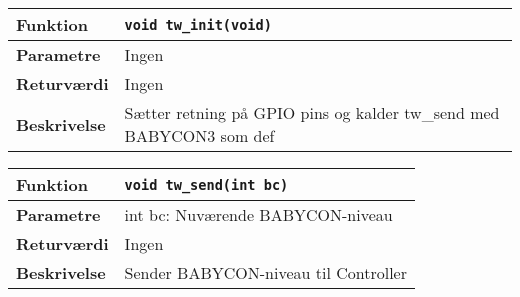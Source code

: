 \begin{center}
    \begin{tabular}{ | l | p{} |}
    \hline
    \textbf{Funktion}	& \verb+void tw_init(void) +						\\ \hline
    \textbf{Parametre} 	& Ingen			\\ \hline
    \textbf{Returværdi}	& Ingen	 								\\ \hline
    \textbf{Beskrivelse}& Sætter retning på GPIO pins og kalder tw\_send med BABYCON3 som def		\\ \hline
    \end{tabular}
\end{center}

\begin{center}
    \begin{tabular}{ | l | p{} |}
    \hline
    \textbf{Funktion}	& \verb+void tw_send(int bc) +						\\ \hline
    \textbf{Parametre} 	& int bc: Nuværende BABYCON-niveau			\\ \hline
    \textbf{Returværdi}	& Ingen	 								\\ \hline
    \textbf{Beskrivelse}& Sender BABYCON-niveau til Controller		\\ \hline
    \end{tabular}
\end{center}


